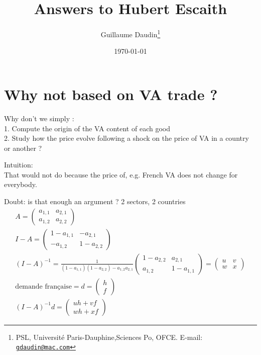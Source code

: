 \documentclass[11pt,a4paper]{article}
\newcommand{\email}[1]{\href{mailto:#1}{\nolinkurl{#1}}}
\begin{document}
\title{Answers to Hubert Escaith\\
\vspace{1cm}
}
\vspace{1cm}
\date{\today}
\author{Guillaume Daudin\thanks{PSL, Universit\'e Paris-Dauphine,Sciences Po, OFCE. E-mail: \email{gdaudin@mac.com}}}
\maketitle

\section{Why not based on VA trade ?}
Why don't we simply : \\
1. Compute the origin of the VA content of each good \\
2. Study how the price evolve following a shock on the price of VA in a country or another ?

Intuition: \\
That would not do because the price of, e.g. French VA does not change for everybody.

Doubt: is that enough an argument ?
2 sectors, 2 countries
\begin{eqnarray}
A=\left(\begin{matrix}a_{1,1}&a_{2,1}\\a_{1,2}&a_{2,2}\end{matrix}\right)
\\
I-A=\left(\begin{matrix}1-a_{1,1}&-a_{2,1}\\-a_{1,2}&1-a_{2,2}\end{matrix}\right)
\\
\left(I-A\right)^{-1}=\frac{1}{\left(1-a_{1,1}\right)\left(1-a_{2,2}\right)-a_{1,2}a_{2,1}}\left(\begin{matrix}1-a_{2,2}&a_{2,1}\\a_{1,2}&1-a_{1,1}\end{matrix}\right) =\left(\begin{matrix}u&v\\w&x\end{matrix}\right)
\\
\text{demande française}=d=\left(\begin{matrix}h\\f\end{matrix}\right) \\
\left(I-A\right)^{-1}d=\left(\begin{matrix}uh+vf\\wh+xf\end{matrix}\right)
\end{eqnarray}
\end{document}
